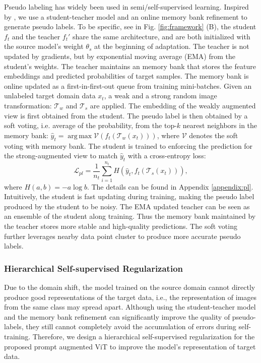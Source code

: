 \documentclass{article} \usepackage{iclr2023_conference,times}
\DeclareMathOperator*{\argmax}{arg\,max}
\begin{document}
Pseudo labeling has widely been used in semi/self-supervised learning. Inspired by \citet{tarvainen2017mean,sohn2020fixmatch,chen2022contrastive}, we use a student-teacher model and an online memory bank refinement to generate pseudo labels. To be specific, see in Fig. \ref{fig:framework} (B), the student $f_t$ and the teacher $f_t'$ share the same architecture, and are both initialized with the source model's weight $\theta_s$ at the beginning of adaptation. The teacher is not updated by gradients, but by exponential moving average (EMA) from the student's weights. The teacher maintains an memory bank that stores the feature embeddings and predicted probabilities of target samples. The memory bank is online updated as a first-in-first-out queue from training mini-batches. Given an unlabeled target domain data $x_t$, a weak and a strong random image transformation: $\mathcal{T}_w$ and $\mathcal{T}_s$ are applied. The embedding of the weakly augmented view is first obtained from the student.  The pseudo label is then obtained by a soft voting, i.e. average of the probability, from the top-$k$ nearest neighbors in the memory bank: $\hat{y}_t = \argmax \mathcal{V}(f_t(\mathcal{T}_w(x_t)))$, where $\mathcal{V}$ denotes the soft voting with memory bank. The student is trained to enforcing the prediction for the strong-augmented view to match $\hat{y}_t$ with a cross-entropy loss:
\begin{equation}
    \mathcal{L}_{pl}=\frac{1}{n_t}\sum_{i=1}^{n_t}H(\hat{y}_t, f_t(\mathcal{T}_s(x_t))),
\end{equation}
where $H(a, b)=-a\log b$. The details can be found in Appendix \ref{appendix:pl}. Intuitively, the student is fast updating during training, making the pseudo label produced by the student to be noisy. The EMA updated teacher can be seen as an ensemble of the student along training. Thus the memory bank maintained by the teacher stores more stable and high-quality predictions. The soft voting further leverages nearby data point cluster to produce more accurate pseudo labels.


\subsubsection{Hierarchical Self-supervised  Regularization}

Due to the domain shift, the model trained on the source domain cannot directly produce good representations of the target data, i.e., the representation of images from the same class may spread apart. Although using the student-teacher model and the memory bank refinement can significantly improve the quality of pseudo-labels, they still cannot completely avoid the accumulation of errors during self-training. Therefore, we design a hierarchical self-supervised regularization for the proposed prompt augmented ViT to improve the model's representation of target data.
\end{document}

